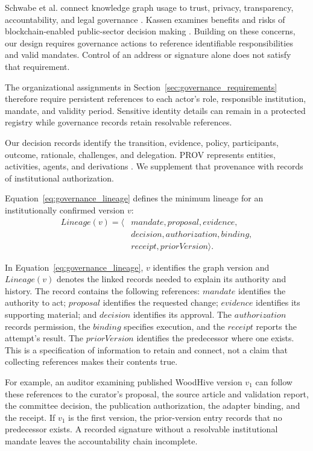 \documentclass[journal]{IEEEtran}
\begin{document}
Schwabe et al. connect knowledge graph usage to trust,
privacy, transparency, accountability, and legal governance
\cite{Schwabe2020KGTrustGovernance}. Kassen examines benefits
and risks of blockchain-enabled public-sector decision making
\cite{Kassen2025BlockchainGovernance}. Building on these
concerns, our design requires governance actions to reference
identifiable responsibilities and valid mandates. Control of
an address or signature alone does not satisfy that requirement.

The organizational assignments in
Section~\ref{sec:governance_requirements} therefore require
persistent references to each actor's role, responsible
institution, mandate, and validity period. Sensitive identity
details can remain in a protected registry while governance
records retain resolvable references.

Our decision records identify the transition, evidence,
policy, participants, outcome, rationale, challenges, and
delegation. PROV represents entities, activities, agents,
and derivations \cite{Moreau2013PROV,Lebo2013PROVO}.
We supplement that provenance with records of institutional
authorization.

Equation~\ref{eq:governance_lineage} defines the minimum
lineage for an institutionally confirmed version $v$:
\begin{equation}
\label{eq:governance_lineage}
\begin{aligned}
Lineage(v)=\langle&
mandate,proposal,evidence,\\
&decision,authorization,binding,\\
&receipt,priorVersion\rangle.
\end{aligned}
\end{equation}

In Equation~\ref{eq:governance_lineage}, $v$ identifies the graph
version and $Lineage(v)$ denotes the linked records needed to
explain its authority and history. The record contains the following
references: $mandate$ identifies the authority to act;
$proposal$ identifies the requested change; $evidence$ identifies
its supporting material; and $decision$ identifies its approval.
The $authorization$ records permission, the $binding$ specifies
execution, and the $receipt$ reports the attempt's result.
The $priorVersion$ identifies the predecessor where one exists.
This is a specification of information to retain and connect,
not a claim that collecting references makes their contents true.

For example, an auditor examining published WoodHive version $v_1$
can follow these references to the curator's proposal, the source
article and validation report, the committee decision, the
publication authorization, the adapter binding, and the receipt.
If $v_1$ is the first version, the prior-version entry records that
no predecessor exists. A recorded signature without a resolvable
institutional mandate leaves the accountability chain incomplete.
\end{document}
